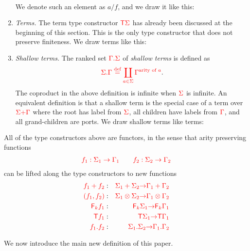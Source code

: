 \begin{definition}[Types]
\begin{enumerate}
\begin{align*}
            \end{align*}
            We denote such an element as $a/f$, and we draw it like this: 
        \item \emph{Terms.} The term type constructor ${\color{red}{\mathsf T}} {\color{red}{\Sigma}}$ has already been discussed at the beginning of this section. This is the only type constructor that does not preserve finiteness. We draw terms like this:
        \item \emph{Shallow terms.} The  ranked set ${\color{red}{{\color{red}{\Gamma}}. {\color{red}{\Sigma}}}}$ of  \emph{shallow terms} is defined as
        \begin{align*}
            {\color{red}{{\color{red}{{\color{red}{\Sigma}}. {\color{red}{\Gamma}}}} \stackrel{\text{def}}=\coprod_{a \in {\color{red}{\Sigma}}} {\color{red}{\Gamma}}^{\text{arity of $a$}}}}.
        \end{align*}
        The coproduct in the above definition is infinite when ${\color{red}{\Sigma}}$ is infinite. 
        An equivalent definition is that a shallow term  is the special case of  a term over ${\color{red}{\Sigma}} {\color{red}{+}} {\color{red}{\Gamma}}$ where  the root has label from ${\color{red}{\Sigma}}$, all children have labels  from ${\color{red}{\Gamma}}$, and all grand-children are ports. We draw shallow terms like terms:
    \end{enumerate}
\end{definition}


\newcommand{\funcitem}[3]{\ranked{#1  } &:& \ranked{#2} \rto  \ranked{#3}}
All of the type constructors  above are functors, in the sense  that  arity preserving functions
\begin{align*}
{\color{red}{f_1 : \Sigma_1 \to \Gamma_1 \qquad f_2 : \Sigma_2 \to \Gamma_2}}
\end{align*}       
can be lifted along the type constructors to new functions
\begin{eqnarray}
\label{eq:liftplus}\funcitem{f_1 + f_2}{\Sigma_1 + \Sigma_2}{\Gamma_1 + \Gamma_2} \\
\funcitem{(f_1,f_2)}{\Sigma_1 \otimes \Sigma_2}{\Gamma_1 \otimes \Gamma_2}\\
\funcitem{\reduce k f_1}{\reduce k \Sigma_1}{\reduce k \Gamma_1}\\
\funcitem{\tmonad f_1}{\tmonad \Sigma_1}{\tmonad \Gamma_1}\\
\label{eq:liftshallow}\funcitem{\shallowterm{f_1}{f_2}}{\shallowterm{\Sigma_1}{\Sigma_2}}{\shallowterm {\Gamma_1}{\Gamma_2}} 
\end{eqnarray}

We now introduce the main new definition of this paper.

